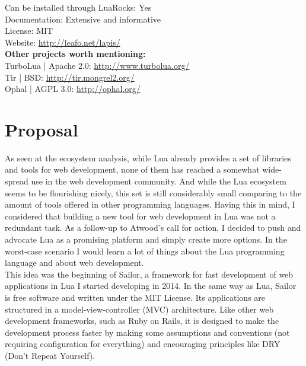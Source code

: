 \documentclass{article}
\begin{document}
Can be installed through LuaRocks: Yes\\ 

Documentation: Extensive and informative\\

License: MIT\\

Website: \url{http://leafo.net/lapis/}\\

\textbf{Other projects worth mentioning:}\\

TurboLua | Apache 2.0: \url{http://www.turbolua.org/} \\

Tir | BSD: \url{http://tir.mongrel2.org/} \\

Ophal | AGPL 3.0: \url{http://ophal.org/} \\

	\newpage
\section{Proposal}

As seen at the ecosystem analysis, while Lua already provides a set of libraries and tools for web development, none of them has reached a somewhat wide-spread use in the web development community. And while the Lua ecosystem seems to be flourishing nicely, this set is still considerably small comparing to the amount of tools offered in other programming languages. Having this in mind, I considered that building a new tool for web development in Lua was not a redundant task. As a follow-up to Atwood's call for action, I decided to push and advocate Lua as a promising platform and simply create more options. In the worst-case scenario I would learn a lot of things about the Lua programming language and about web development. \\

This idea was the beginning of Sailor, a framework for fast development of web applications in Lua I started developing in 2014. In the same way as Lua, Sailor is free software and written under the MIT License. Its applications are structured in a model-view-controller (MVC) architecture. Like other web development frameworks, such as Ruby on Rails, it is designed to make the development process faster by making some assumptions and conventions (not requiring configuration for everything) and encouraging principles like DRY (Don't Repeat Yourself).\\
\end{document}
